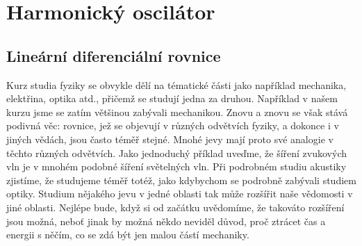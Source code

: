 \setchaptertoc
\chapter{Harmonický oscilátor}\label{fyz:IchapXXI}
  \section{Lineární diferenciální rovnice}\label{fyz:IchapXXIsecI}
    Kurz studia fyziky se obvykle dělí na tématické části jako například mechanika, elektřina,
    optika atd., přičemž se studují jedna za druhou. Například v našem kurzu jsme se zatím většinou
    zabývali mechanikou. Znovu a znovu se však stává podivná věc: rovnice, jež se objevují v různých
    odvětvích fyziky, a dokonce i v jiných vědách, jsou často téměř stejné. Mnohé jevy mají proto
    své analogie v těchto různých odvětvích. Jako jednoduchý příklad uveďme, že šíření zvukových vln
    je v mnohém podobné šíření světelných vln. Při podrobném studiu akustiky zjistíme, že studujeme
    téměř totéž, jako kdybychom se podrobně zabývali studiem optiky. Studium nějakého jevu v jedné
    oblasti tak může rozšířit naše vědomosti v jiné oblasti. Nejlépe bude, když si od začátku
    uvědomíme, že takováto rozšíření jsou možná, neboť jinak by možná někdo neviděl důvod, proč
    ztrácet čas a energii s něčím, co se zdá být jen malou částí mechaniky.
    
